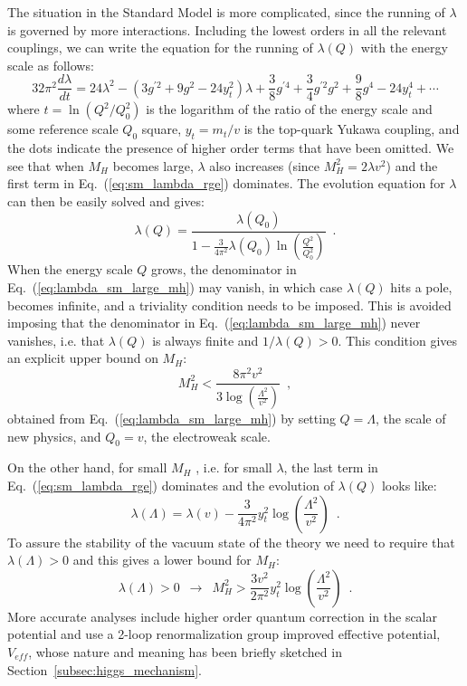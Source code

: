 \documentclass[12pt,prd,onecolumn,aps,floats,superscriptaddress,floatfix,nofootinbib]{revtex4-2}
\begin{document}
The situation in the Standard Model is more complicated, since the
running of $\lambda$ is governed by more interactions. Including the
lowest orders in all the relevant couplings, we can write the equation
for the running of $\lambda(Q)$ with the energy scale as follows:
\begin{equation}
\label{eq:sm_lambda_rge}
32\pi^2\frac{d\lambda}{dt}=
24\lambda^2-(3g^{\prime 2}+9g^2-24y_t^2)\lambda
+\frac{3}{8}g^{\prime 4}+\frac{3}{4}g^{\prime 2}g^2+\frac{9}{8}g^4
-24y_t^4+\cdots
\end{equation}
where $t\!=\!\ln(Q^2/Q_0^2)$ is the logarithm of the ratio of the
energy scale and some reference scale $Q_0$ square, $y_t\!=\!m_t/v$ is
the top-quark Yukawa coupling, and the dots indicate the presence of
higher order terms that have been omitted. We see that when $M_H$
becomes large, $\lambda$ also increases (since $M_H^2\!=\!2\lambda
v^2$) and the first term in Eq.~(\ref{eq:sm_lambda_rge})
dominates. The evolution equation for $\lambda$ can then be easily
solved and gives:
\begin{equation}
\label{eq:lambda_sm_large_mh}
\lambda(Q)=\frac{\lambda(Q_0)}{1-\frac{3}{4\pi^2}\lambda(Q_0)
\ln\left(\frac{Q^2}{Q_0^2}\right)}\,\,\,.
\end{equation}
When the energy scale $Q$ grows, the
denominator in Eq.~(\ref{eq:lambda_sm_large_mh}) may vanish, in which
case $\lambda(Q)$ hits a pole, becomes infinite, and a triviality
condition needs to be imposed. This is avoided imposing that the
denominator in Eq.~(\ref{eq:lambda_sm_large_mh}) never vanishes, i.e. 
that $\lambda(Q)$ is always finite
and $1/\lambda(Q)>0$. This condition gives an explicit upper bound on
$M_H$:
\begin{equation}
M_H^2<\frac{8\pi^2v^2}{3\log\left(\frac{\Lambda^2}{v^2}\right)}\,\,\,,
\end{equation}
obtained from Eq.~(\ref{eq:lambda_sm_large_mh}) by setting
$Q\!=\!\Lambda$, the scale of new physics, and $Q_0\!=\!v$, the
electroweak scale.

On the other hand, for small $M_H$ , i.e. for small $\lambda$, the
last term in Eq.~(\ref{eq:sm_lambda_rge}) dominates and the
evolution of $\lambda(Q)$ looks like:
\begin{equation}
\lambda(\Lambda)=\lambda(v)-\frac{3}{4\pi^2}y_t^2
\log\left(\frac{\Lambda^2}{v^2}\right)\,\,\,.
\end{equation}
To assure the stability of the vacuum state of the theory we need to
require that $\lambda(\Lambda)\!>\!0$ and this gives a lower bound for
$M_H$:
\begin{equation}
\lambda(\Lambda)>0 \,\,\,\longrightarrow \,\,\,
M_H^2>\frac{3v^2}{2\pi^2}y_t^2\log\left(\frac{\Lambda^2}{v^2}\right)\,\,\,.
\end{equation}
More accurate analyses include higher order quantum correction in the
scalar potential and use a 2-loop renormalization group improved
effective potential, $V_{eff}$, whose nature and meaning has been
briefly sketched in Section~\ref{subsec:higgs_mechanism}.
\end{document}
